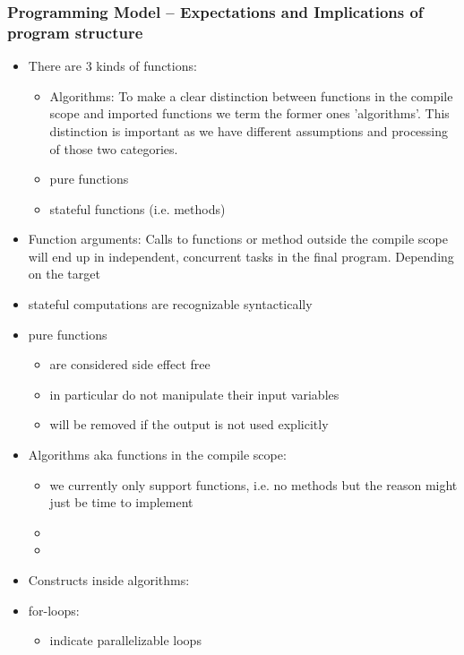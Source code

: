 \subsubsection{Programming Model -- Expectations and Implications of program structure}
\begin{itemize}
    \item There are 3 kinds of functions:
    \begin{itemize}
        \item Algorithms: To make a clear distinction between functions in the compile scope and imported functions we term the former ones 'algorithms'. This distinction is important as we have different assumptions and processing of those two categories.
        \item pure functions
        \item stateful functions (i.e. methods)
    \end{itemize}
    \item Function arguments: Calls to functions or method outside the compile scope will end up in independent, concurrent tasks in the final program. Depending on the target 
    \item stateful computations are recognizable syntactically
    \item pure functions
    \begin{itemize}
        \item are considered side effect free
        \item in particular do not manipulate their input variables
        \item will be removed if the output is not used explicitly
    \end{itemize}
    \item Algorithms aka functions in the compile scope: 
    \begin{itemize}
        \item we currently only support functions, i.e. no methods but the reason might just be time to implement
        \item {}
        \item 
    \end{itemize}
    \item[] Constructs inside algorithms:
    \item for-loops:
    \begin{itemize}
        \item indicate parallelizable loops

\end{itemize}
\end{itemize}
